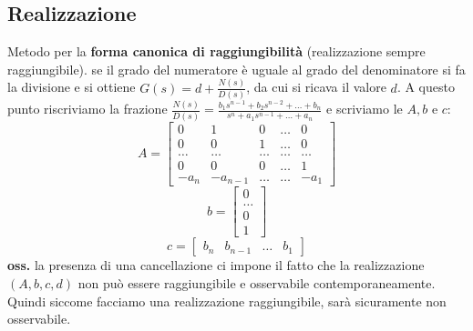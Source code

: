 \begin{landscape}
\begin{multicols*}{3}
    \subsection*{Realizzazione}
    Metodo per la \textbf{forma canonica di raggiungibilità} (realizzazione sempre raggiungibile).
    se il grado del numeratore è uguale al grado del denominatore si fa la divisione e si ottiene $G(s) = d + \frac{N(s)}{D(s)}$, da cui si ricava il valore $d$. A questo punto riscriviamo la frazione $\frac{N(s)}{D(s)} = \frac{ b_1 s^{n-1} + b_2 s^{n-2} + \dots + b_n }{ s^n + a_1 s^{n-1} + \dots + a_n }$ e scriviamo le $A, b$ e $c$:
    \[
        A=\left[\begin{matrix}
            0 & 1 & 0 & \dots & 0 \\
            0 & 0 & 1 & \dots & 0 \\
            \dots & \dots &\dots&\dots&\dots\\
            0 & 0 & 0 & \dots & 1\\
            -a_n & -a_{n-1} & \dots & \dots & -a_1
        \end{matrix}\right]
    \]
    \[
        b=\left[\begin{matrix}
            0\\\dots\\0\\1
        \end{matrix}\right]
    \]
    \[
        c=\left[\begin{matrix}
            b_n & b_{n-1} & \dots & b_1
        \end{matrix}\right]
    \]
    \textbf{oss.} la presenza di una cancellazione ci impone il fatto che la realizzazione
    $ (A, b, c, d)$ non può essere raggiungibile e osservabile contemporaneamente. Quindi siccome facciamo una realizzazione raggiungibile, sarà sicuramente non osservabile.

\end{multicols*}
\end{landscape}
